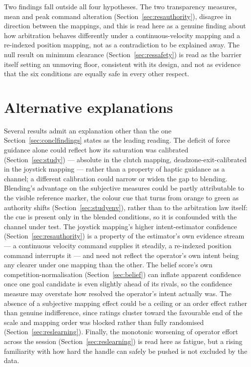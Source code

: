 \documentclass[12pt,a4paper,twoside,openright]{report}
\begin{document}
Two findings fall outside all four hypotheses. The two transparency measures, mean and peak command alteration (Section~\ref{sec:resauthority}), disagree in direction between the mappings, and this is read here as a genuine finding about how arbitration behaves differently under a continuous-velocity mapping and a re-indexed position mapping, not as a contradiction to be explained away. The null result on minimum clearance (Section~\ref{sec:ressafety}) is read as the barrier itself setting an unmoving floor, consistent with its design, and not as evidence that the six conditions are equally safe in every other respect.

\section{Alternative explanations}
\label{sec:discussion-alternatives}

Several results admit an explanation other than the one Section~\ref{sec:conclfindings} states as the leading reading. The deficit of force guidance alone could reflect how its saturation was calibrated (Section~\ref{sec:study}) --- absolute in the clutch mapping, deadzone-exit-calibrated in the joystick mapping --- rather than a property of haptic guidance as a channel; a different calibration could narrow or widen the gap to blending. Blending's advantage on the subjective measures could be partly attributable to the visible reference marker, the colour cue that turns from orange to green as authority shifts (Section~\ref{sec:studyenv}), rather than to the arbitration law itself: the cue is present only in the blended conditions, so it is confounded with the channel under test. The joystick mapping's higher intent-estimator confidence (Section~\ref{sec:resauthority}) is a property of the estimator's own evidence stream --- a continuous velocity command supplies it steadily, a re-indexed position command interrupts it --- and need not reflect the operator's own intent being any clearer under one mapping than the other. The belief score's own competition-normalisation (Section~\ref{sec:belief}) can inflate apparent confidence once one goal candidate is even slightly ahead of its rivals, so the confidence measure may overstate how resolved the operator's intent actually was. The absence of a subjective mapping effect could be a ceiling or an order effect rather than genuine indifference, since ratings cluster toward the favourable end of the scale and mapping order was blocked rather than fully randomised (Section~\ref{sec:reslearning}). Finally, the monotonic worsening of operator effort across the session (Section~\ref{sec:reslearning}) is read here as fatigue, but a rising familiarity with how hard the handle can safely be pushed is not excluded by the data.
\end{document}
